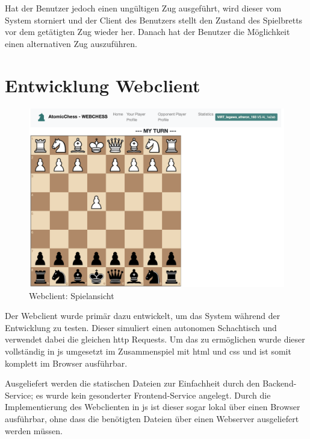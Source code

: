 Hat der Benutzer jedoch einen ungültigen Zug ausgeführt, wird dieser vom
System storniert und der Client des Benutzers stellt den Zustand des
Spielbretts vor dem getätigten Zug wieder her. Danach hat der Benutzer
die Möglichkeit einen alternativen Zug auszuführen.

\hypertarget{entwicklung-webclient}{%
\section{Entwicklung Webclient}\label{entwicklung-webclient}}

\begin{figure}
\centering
\includegraphics{images/ATC_webclient.png}
\caption{Webclient: Spielansicht \label{ATC_webclient}}
\end{figure}

Der Webclient wurde primär dazu entwickelt, um das System während der
Entwicklung zu testen. Dieser simuliert einen autonomen Schachtisch und
verwendet dabei die gleichen \gls{http} Requests. Um das zu ermöglichen
wurde dieser vollständig in \gls{js} umgesetzt im Zusammenspiel mit
\gls{html} und \gls{css} und ist somit komplett im Browser ausführbar.

Ausgeliefert werden die statischen Dateien zur Einfachheit durch den
Backend-Service; es wurde kein gesonderter Frontend-Service angelegt.
Durch die Implementierung des Webclienten in \gls{js} ist dieser sogar
lokal über einen Browser ausführbar, ohne dass die benötigten Dateien
über einen Webserver ausgeliefert werden müssen.

